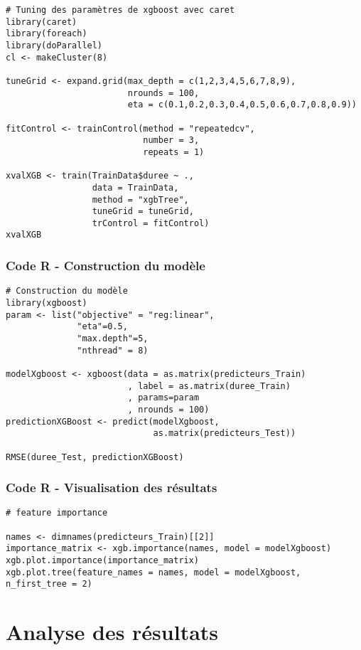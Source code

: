 \documentclass[t,9pt,pdftexx,xcolor=dvipsnames]{beamer}
\begin{document}
\begin{frame}[c, fragile]

 \begin{lstlisting}
# Tuning des paramètres de xgboost avec caret
library(caret)
library(foreach)
library(doParallel)
cl <- makeCluster(8)

tuneGrid <- expand.grid(max_depth = c(1,2,3,4,5,6,7,8,9),
                        nrounds = 100,
                        eta = c(0.1,0.2,0.3,0.4,0.5,0.6,0.7,0.8,0.9))

fitControl <- trainControl(method = "repeatedcv",
                           number = 3,
                           repeats = 1)

xvalXGB <- train(TrainData$duree ~ .,
                 data = TrainData,
                 method = "xgbTree",
                 tuneGrid = tuneGrid,
                 trControl = fitControl)
xvalXGB
 \end{lstlisting}
\end{frame}

\begin{frame}[c, fragile]
\frametitle{Code R - Construction du modèle}
 \begin{lstlisting}
# Construction du modèle
library(xgboost)
param <- list("objective" = "reg:linear",
              "eta"=0.5,
              "max.depth"=5,
              "nthread" = 8)

modelXgboost <- xgboost(data = as.matrix(predicteurs_Train)
                        , label = as.matrix(duree_Train)
                        , params=param
                        , nrounds = 100)
predictionXGBoost <- predict(modelXgboost,
                             as.matrix(predicteurs_Test))

RMSE(duree_Test, predictionXGBoost)
 \end{lstlisting}
\end{frame}

\begin{frame}[c, fragile]
\frametitle{Code R - Visualisation des résultats}
 \begin{lstlisting}
# feature importance

names <- dimnames(predicteurs_Train)[[2]]
importance_matrix <- xgb.importance(names, model = modelXgboost)
xgb.plot.importance(importance_matrix)
xgb.plot.tree(feature_names = names, model = modelXgboost, n_first_tree = 2)
 \end{lstlisting}
\end{frame}
\section{Analyse des résultats}
\end{document}
